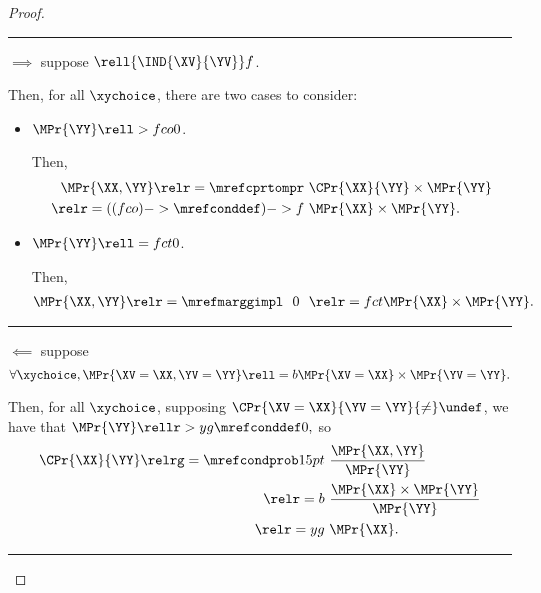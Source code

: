 \begin{proof}
  \hrule
  $\implies$ suppose $\rell {\IND{\XV}{\YV}} f $.

  Then, for all $\xychoice$, there are two cases to consider:
  \begin{itemize}
    \item {} $\MPr{\YY} \rell > fco 0$.

    Then,
    \begin{align*}
      \MPr{\XX, \YY}
      \relr = {\mrefcprtompr} &\ \CPr{\XX}{\YY} \times \MPr{\YY}\\
      \relr = {((fco)->\mrefconddef)->f} &\ \MPr{\XX} \times \MPr{\YY}.
    \end{align*}

    \item {} $\MPr{\YY} \rell = fct 0$.

    Then,
    \begin{align*}
      \MPr{\XX, \YY} \relr = {\mrefmarggimpl} \ \ 0\ \ 
      \relr = fct \MPr{\XX} \times \MPr{\YY}.
    \end{align*}
  \end{itemize}

  \hrule
  $\impliedby$ suppose 
  $$\forall \xychoice,
  \MPr{\XV = \XX, \YV = \YY} \rell = b
  \MPr{\XV = \XX}
  \times
  \MPr{\YV = \YY}.$$

  Then, for all $\xychoice$, supposing $\CPr{\XV = \XX}{\YV = \YY} {\ne} \undef$, we have that
  $\MPr{\YY} \rellr > yg {\mrefconddef} 0,$
  so
  \begin{align*}
    \CPr{\XX}{\YY}
    \relrg = {\mrefcondprob} 15pt \ & 
    \frac{\MPr{\XX, \YY}}{\MPr{\YY}}
    \\
    \relr = b \ & \frac{\MPr{\XX} \times \MPr{\YY}}{\MPr{\YY}}\\
    \relr = yg \ & \MPr{\XX}.
  \end{align*}
  \hrule
\end{proof}
